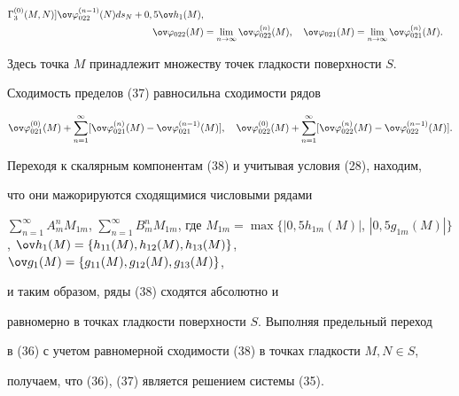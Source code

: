 \begin{pf}
\begin{align}
\Gamma^{(0)}_3(M,N)]\ov\varphi{}^{(n-1)}_{022}(N)ds_N+0,5\ov h_1(M),\\ 


%


\ov\varphi_{022}(M)&=\lim_{n\to\infty}\ov\varphi{}^{(n)}_{022}(M),\quad 


\ov\varphi_{021}(M)=\lim_{n\to\infty}\ov\varphi{}^{(n)}_{021}(M). 


\end{align} 


Здесь точка $M$ принадлежит множеству точек гладкости поверхности $S$. 


Сходимость пределов (37) равносильна сходимости рядов 


\begin{equation} 


\ov\varphi{}^{(0)}_{021}(M)+\sum^\infty_{n=1}[ 


\ov\varphi{}^{(n)}_{021}(M)-\ov\varphi{}^{(n-1)}_{021}(M)],\quad 


\ov\varphi{}^{(0)}_{022}(M)+\sum^\infty_{n=1} 


[\ov\varphi{}^{(n)}_{022}(M)-\ov\varphi{}^{(n-1)}_{022}(M)]. 


\end{equation} 


 


Переходя к скалярным компонентам (38) и учитывая условия (28), находим,  


что они мажорируются сходящимися числовыми рядами 


$\sum\limits^\infty_{n=1}A^n_m M_{1m}$, $\sum\limits^\infty_{n=1}B^n_m 


M_{1m}$, где $M_{1m}=\max\{|0,5h_{1m}(M)|$, $|0,5g_{1m}(M)|\}$, $\ov 




h_1(M)=\{h_{11}(M),h_{12}(M),h_{13}(M)\}$, $\ov g_1(M)=\{g_{11}(M), 


g_{12}(M),g_{13}(M)\}$, 


и таким образом, ряды (38) сходятся абсолютно и  


равномерно в точках гладкости поверхности $S$. Выполняя предельный переход  


в (36) с учетом равномерной сходимости (38) в точках гладкости $M,N\in S$,  


получаем, что (36), (37) является решением системы (35). 


 



\end{pf}
